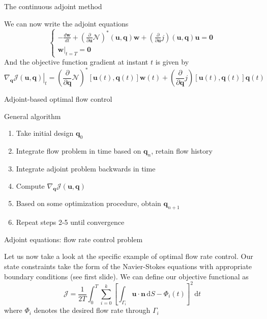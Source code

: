 \documentclass{beamer}
\begin{document}
\begin{frame}{The continuous adjoint method}

	We can now write the adjoint equations
	\begin{equation}
		\left\{ \begin{array}{c}
		-\frac{d\mathbf{w}}{dt}+\left(\frac{\partial}{\partial\mathbf{u}}\mathbf{\mathcal{N}}\right)^{*}\left(\mathbf{u},\mathbf{q}\right)\mathbf{w}+\left(\frac{\partial}{\partial\mathbf{u}} j\right)\left(\mathbf{u},\mathbf{q}\right)\mathbf{u}=\mathbf{0}\\
		\left.\mathbf{w}\right|_{t=T}=\mathbf{0}
		\end{array}\right.
	\end{equation}
	And the objective function gradient at instant $t$ is given by
	\begin{equation}
		\left.\nabla_{\mathbf{q}}\mathcal{J}\left(\mathbf{u},\mathbf{q}\right)\right|_{t}=\left(\frac{\partial}{\partial\mathbf{q}}\mathbf{\mathcal{N}}\right)^{*}\left[\mathbf{u}\left(t\right),\mathbf{q}\left(t\right)\right]\mathbf{w}\left(t\right)+\left(\frac{\partial}{\partial\mathbf{q}} j\right)\left[\mathbf{u}\left(t\right),\mathbf{q}\left(t\right)\right]\mathbf{q}\left(t\right)
	\end{equation}

\end{frame}

\begin{frame}{Adjoint-based optimal flow control}
\begin{block}{General algorithm}
\begin{enumerate}
\item Take initial design $\mathbf{q}_0$
\item Integrate flow problem in time based on $\mathbf{q}_n$, retain flow history
\item Integrate adjoint problem backwards in time
\item Compute $\nabla_{\mathbf{q}}\mathcal{J}\left(\mathbf{u},\mathbf{q}\right)$
\item Based on some optimization procedure, obtain $\mathbf{q}_{n + 1}$
\item Repeat steps 2-5 until convergence
\end{enumerate}
\end{block}
\end{frame}

\begin{frame}{Adjoint equations: flow rate control problem}

	Let us now take a look at the specific example of optimal flow rate control. Our state constraints take the form of the Navier-Stokes equations with appropriate boundary conditions (see first slide). We can define our objective functional as
	\begin{equation}
		\mathcal{J}=\frac{1}{2T}\int_{0}^{T}\sum_{i=0}^{k}\left[\int_{\Gamma_{i}}\mathbf{u}\cdot\mathbf{n}\,\mathrm{d}S-\Phi_{i}\left(t\right)\right]^{2}\,\mathrm{d}t
	\end{equation}
	where $\Phi_{i}$ denotes the desired flow rate through $\Gamma_{i}$

\end{frame}
\end{document}
